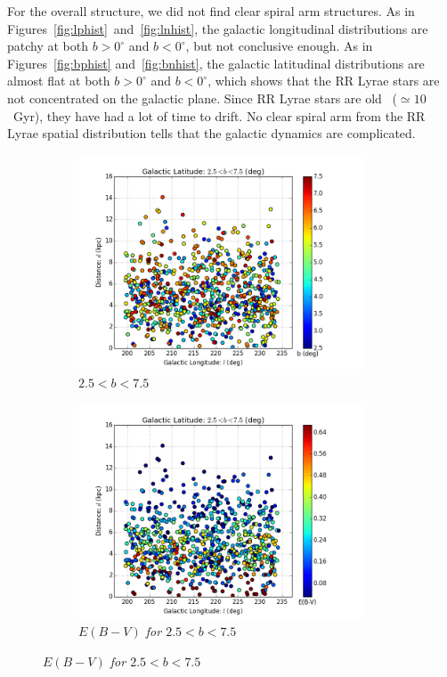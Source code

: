 \documentclass[aps,prb,twocolumn,superscriptaddress]{revtex4-1}
\begin{document}
\indent For the overall structure, we did not find clear spiral arm structures. As in Figures~\ref{fig:lphist}~and~\ref{fig:lnhist}, the galactic longitudinal distributions are patchy at both $b>0^{\circ}$ and $b<0^{\circ}$, but not conclusive enough.  As in Figures~\ref{fig:bphist} and~\ref{fig:bnhist}, the galactic latitudinal distributions are almost flat at both $b>0^{\circ}$ and $b<0^{\circ}$, which shows that the RR Lyrae stars are not concentrated on the galactic plane. Since RR Lyrae stars are old~\cite{Astro} ($\simeq 10$~Gyr), they have had a lot of time to drift. No clear spiral arm from the RR Lyrae spatial distribution tells that the galactic dynamics are complicated.







\begin{figure}
	\centering
	\begin{subfigure}{.5\textwidth}
	  \centering
	  \includegraphics[width=3.35in]{figures/PlotsSpace15/dist_b_lp_limit15.png}
		\caption{\it \small{$2.5 < b < 7.5$ }}
		\label{fig:blp}
	\end{subfigure}%
	\begin{subfigure}{.5\textwidth}
	  \centering
			\includegraphics[width=3.35in]{figures/PlotsSpace15/dist_EBV_lp_limit15.png}
		\caption{\it \small{$E(B-V)$ for $2.5 < b < 7.5$ }}
		\label{fig:EBVlp}
	\end{subfigure}%
	

\end{figure}
\end{document}
